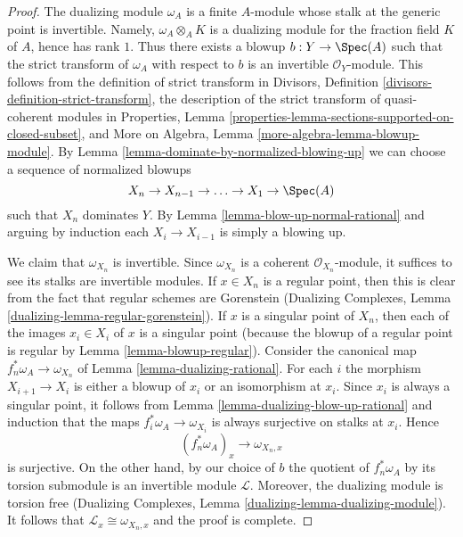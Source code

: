 \begin{proof}
The dualizing module $\omega_A$ is a finite $A$-module whose stalk at
the generic point is invertible. Namely, $\omega_A \otimes_A K$
is a dualizing module for the fraction field $K$ of $A$, hence has
rank $1$. Thus there exists a blowup $b : Y \to \Spec(A)$ such that
the strict transform of $\omega_A$ with respect to $b$ is an invertible
$\mathcal{O}_Y$-module. This follows from the definition of strict
transform in
Divisors, Definition \ref{divisors-definition-strict-transform},
the description of the strict transform of quasi-coherent modules in
Properties, Lemma
\ref{properties-lemma-sections-supported-on-closed-subset}, and
More on Algebra, Lemma \ref{more-algebra-lemma-blowup-module}.
By Lemma \ref{lemma-dominate-by-normalized-blowing-up}
we can choose a sequence of normalized blowups
$$
X_n \to X_{n - 1} \to \ldots \to X_1 \to \Spec(A)
$$
such that $X_n$ dominates $Y$. By Lemma \ref{lemma-blow-up-normal-rational}
and arguing by induction each $X_i \to X_{i - 1}$ is simply a blowing up.

\medskip\noindent
We claim that $\omega_{X_n}$ is invertible. Since $\omega_{X_n}$
is a coherent $\mathcal{O}_{X_n}$-module, it suffices to see its stalks
are invertible modules. If $x \in X_n$ is a regular point, then this is
clear from the fact that regular schemes are
Gorenstein (Dualizing Complexes, Lemma
\ref{dualizing-lemma-regular-gorenstein}). If $x$ is a singular point of
$X_n$, then each of the images $x_i \in X_i$ of $x$ is a singular point
(because the blowup of a regular point is regular by
Lemma \ref{lemma-blowup-regular}).
Consider the canonical map $f_n^*\omega_A \to \omega_{X_n}$ of
Lemma \ref{lemma-dualizing-rational}. For each $i$ the morphism
$X_{i + 1} \to X_i$ is either a blowup of $x_i$ or an isomorphism
at $x_i$. Since $x_i$ is always a singular point, it follows from
Lemma \ref{lemma-dualizing-blow-up-rational}
and induction that the maps $f_i^*\omega_A \to \omega_{X_i}$
is always surjective on stalks at $x_i$. Hence
$$
(f_n^*\omega_A)_x \longrightarrow \omega_{X_n, x}
$$
is surjective. On the other hand, by our choice of $b$ the quotient
of $f_n^*\omega_A$ by its torsion submodule is an invertible module
$\mathcal{L}$. Moreover, the dualizing module is torsion free
(Dualizing Complexes, Lemma \ref{dualizing-lemma-dualizing-module}).
It follows that $\mathcal{L}_x \cong  \omega_{X_n, x}$ and the proof is
complete.
\end{proof}






